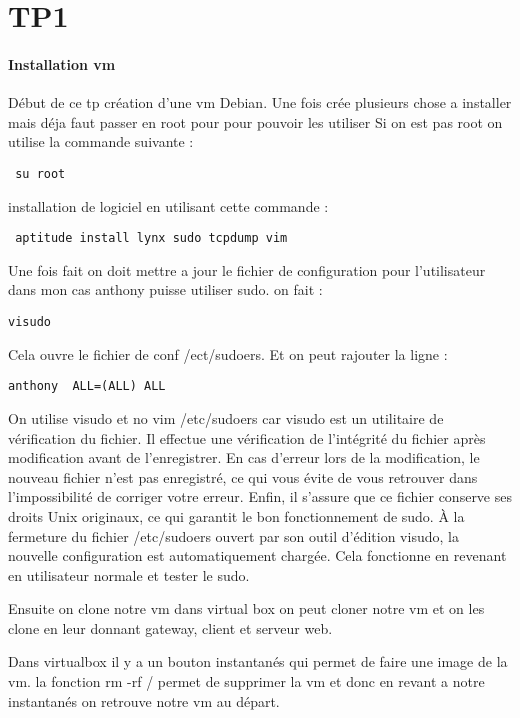 \documentclass[a4paper,12pt]{article}
\begin{document}
 
\section{TP1}
\paragraph{ Installation vm}
Début de ce tp création d'une vm Debian.
Une fois crée plusieurs chose a installer mais déja faut passer en root pour pour pouvoir les utiliser
Si on est pas root on utilise la commande suivante :
\begin{verbatim}
 su root
\end{verbatim}

installation de logiciel en utilisant cette commande :
\begin{verbatim}
 aptitude install lynx sudo tcpdump vim
\end{verbatim}

Une fois fait on doit mettre a jour le fichier de configuration pour l'utilisateur dans mon cas anthony puisse utiliser sudo.
on fait :
\begin{verbatim}
visudo
\end{verbatim}
Cela ouvre le fichier de conf /ect/sudoers. Et on peut rajouter la ligne : 
\begin{verbatim}
anthony  ALL=(ALL) ALL
\end{verbatim}
On utilise visudo et no vim /etc/sudoers car visudo est un utilitaire de vérification du fichier.
Il effectue une vérification de l'intégrité du fichier après modification avant de l'enregistrer. En cas d'erreur lors de la modification, le nouveau fichier n'est pas enregistré, ce qui vous évite de vous retrouver dans l'impossibilité de corriger votre erreur. Enfin, il s'assure que ce fichier conserve ses droits Unix originaux, ce qui garantit le bon fonctionnement de sudo.
À la fermeture du fichier /etc/sudoers ouvert par son outil d'édition visudo, la nouvelle configuration est automatiquement chargée. 
Cela fonctionne en revenant en utilisateur normale et tester le sudo.


Ensuite on clone notre vm dans virtual box on peut cloner notre vm et on les clone en leur donnant
gateway, client et serveur web.


Dans virtualbox il y a un bouton instantanés qui permet de faire une image de la vm.
la fonction rm -rf / permet de supprimer la vm et donc en revant a notre instantanés on retrouve notre vm au départ.
\end{document}
